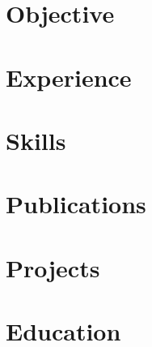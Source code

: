 \documentclass[letter,10pt]{article}
\begin{document}
\section{Objective}


\section{Experience}




\section{Skills}


\section{Publications}


\section{Projects}


\section{Education}

\end{document}
